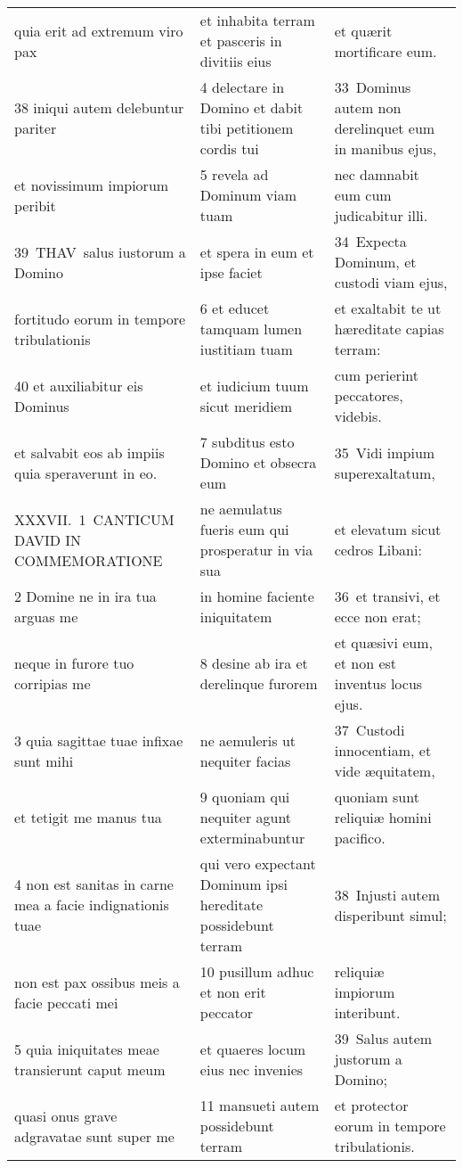 \documentclass{article}
\begin{document}
\begin{longtable}{@{}p{}p{}p{}@{}}
quia erit ad extremum viro pax	&	et inhabita terram et pasceris in divitiis eius	&	et quærit mortificare eum.	\\
38 iniqui autem delebuntur pariter	&	4 delectare in Domino et dabit tibi petitionem cordis tui	&	33 Dominus autem non derelinquet eum in manibus ejus,	\\
et novissimum impiorum peribit	&	5 revela ad Dominum viam tuam	&	nec damnabit eum cum judicabitur illi.	\\
39 THAV salus iustorum a Domino	&	et spera in eum et ipse faciet	&	34 Expecta Dominum, et custodi viam ejus,	\\
fortitudo eorum in tempore tribulationis	&	6 et educet tamquam lumen iustitiam tuam	&	et exaltabit te ut hæreditate capias terram:	\\
40 et auxiliabitur eis Dominus	&	et iudicium tuum sicut meridiem	&	cum perierint peccatores, videbis.	\\
et salvabit eos ab impiis quia speraverunt in eo.	&	7 subditus esto Domino et obsecra eum	&	35 Vidi impium superexaltatum,	\\
XXXVII. 1 CANTICUM DAVID IN COMMEMORATIONE	&	ne aemulatus fueris eum qui prosperatur in via sua	&	et elevatum sicut cedros Libani:	\\
2 Domine ne in ira tua arguas me	&	in homine faciente iniquitatem	&	36 et transivi, et ecce non erat;	\\
neque in furore tuo corripias me	&	8 desine ab ira et derelinque furorem	&	et quæsivi eum, et non est inventus locus ejus.	\\
3 quia sagittae tuae infixae sunt mihi	&	ne aemuleris ut nequiter facias	&	37 Custodi innocentiam, et vide æquitatem,	\\
et tetigit me manus tua	&	9 quoniam qui nequiter agunt exterminabuntur	&	quoniam sunt reliquiæ homini pacifico.	\\
4 non est sanitas in carne mea a facie indignationis tuae	&	qui vero expectant Dominum ipsi hereditate possidebunt terram	&	38 Injusti autem disperibunt simul;	\\
non est pax ossibus meis a facie peccati mei	&	10 pusillum adhuc et non erit peccator	&	reliquiæ impiorum interibunt.	\\
5 quia iniquitates meae transierunt caput meum	&	et quaeres locum eius nec invenies	&	39 Salus autem justorum a Domino;	\\
quasi onus grave adgravatae sunt super me	&	11 mansueti autem possidebunt terram	&	et protector eorum in tempore tribulationis.	\\

\end{longtable}
\end{document}
